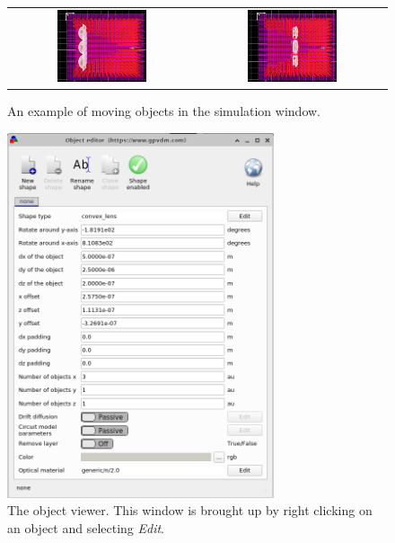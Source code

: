 \begin{figure}[H]
\centering
\begin{tabular}{ c c }

\includegraphics[width=0.5\textwidth,height=0.4\textwidth]{./images/fdtd_5.png}

&
\includegraphics[width=0.5\textwidth,height=0.4\textwidth]{./images/fdtd_6.png}

\\

\end{tabular}
\caption{An example of moving objects in the simulation window.}
\label{fig:fdtdmovingobjects}
\end{figure}




\begin{figure}[H]
\centering
\includegraphics[width=0.7\textwidth]{./images/fdtd_12.png}
\caption{The object viewer. This window is brought up by right clicking on an object and selecting \emph{Edit}.}
\label{fig:objectviewer}
\end{figure}


